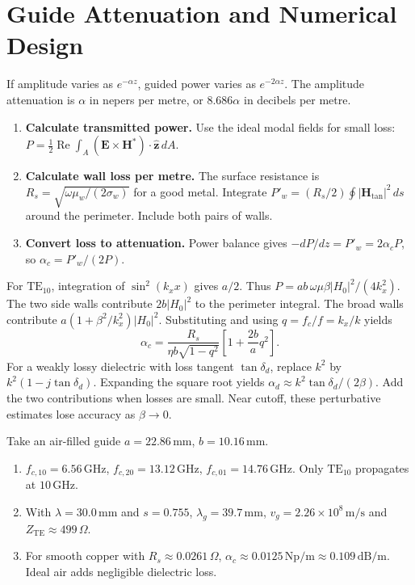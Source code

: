 \documentclass[12pt,a4paper]{article}
\begin{document}
\section{Guide Attenuation and Numerical Design}
\begin{tcolorbox}[defbox,title={Attenuation constant}]
If amplitude varies as $e^{-\alpha z}$, guided power varies as $e^{-2\alpha z}$. The amplitude attenuation is $\alpha$ in nepers per metre, or $8.686\alpha$ in decibels per metre.
\end{tcolorbox}
\begin{enumerate}[leftmargin=*,itemsep=4pt]
\item \textbf{Calculate transmitted power.} Use the ideal modal fields for small loss: $P=\tfrac12\operatorname{Re}\int_A(\mathbf E\times\mathbf H^*)\cdot\hat{\mathbf z}\,dA$.
\item \textbf{Calculate wall loss per metre.} The surface resistance is $R_s=\sqrt{\omega\mu_w/(2\sigma_w)}$ for a good metal. Integrate $P'_w=(R_s/2)\oint |\mathbf H_{\tan}|^2\,ds$ around the perimeter. Include both pairs of walls.
\item \textbf{Convert loss to attenuation.} Power balance gives $-dP/dz=P'_w=2\alpha_cP$, so $\alpha_c=P'_w/(2P)$.
\end{enumerate}
For $\mathrm{TE}_{10}$, integration of $\sin^2(k_xx)$ gives $a/2$. Thus $P=ab\,\omega\mu\beta |H_0|^2/(4k_x^2)$. The two side walls contribute $2b|H_0|^2$ to the perimeter integral. The broad walls contribute $a(1+\beta^2/k_x^2)|H_0|^2$. Substituting and using $q=f_c/f=k_x/k$ yields
\[
\alpha_c=\frac{R_s}{\eta b\sqrt{1-q^2}}\left[1+\frac{2b}{a}q^2\right].
\]
For a weakly lossy dielectric with loss tangent $\tan\delta_d$, replace $k^2$ by $k^2(1-j\tan\delta_d)$. Expanding the square root yields $\alpha_d\approx k^2\tan\delta_d/(2\beta)$. Add the two contributions when losses are small. Near cutoff, these perturbative estimates lose accuracy as $\beta\to0$.
\begin{tcolorbox}[examplebox,title={Single-mode test at 10 GHz}]
Take an air-filled guide $a=22.86\,\mathrm{mm}$, $b=10.16\,\mathrm{mm}$.
\begin{enumerate}[leftmargin=*,itemsep=2pt]
\item $f_{c,10}=6.56\,\mathrm{GHz}$, $f_{c,20}=13.12\,\mathrm{GHz}$, $f_{c,01}=14.76\,\mathrm{GHz}$. Only $\mathrm{TE}_{10}$ propagates at $10\,\mathrm{GHz}$.
\item With $\lambda=30.0\,\mathrm{mm}$ and $s=0.755$, $\lambda_g=39.7\,\mathrm{mm}$, $v_g=2.26\times10^8\,\mathrm{m/s}$ and $Z_{\mathrm{TE}}\approx499\,\Omega$.
\item For smooth copper with $R_s\approx0.0261\,\Omega$, $\alpha_c\approx0.0125\,\mathrm{Np/m}\approx0.109\,\mathrm{dB/m}$. Ideal air adds negligible dielectric loss.
\end{enumerate}
\end{tcolorbox}
\end{document}

